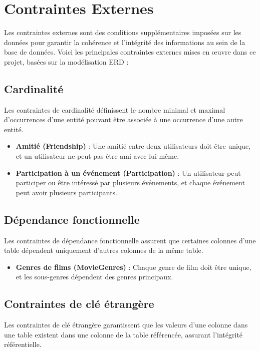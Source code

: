 \section{Contraintes Externes}

Les contraintes externes sont des conditions supplémentaires imposées sur les données pour garantir la cohérence et l'intégrité des informations au sein de la base de données. Voici les principales contraintes externes mises en œuvre dans ce projet, basées sur la modélisation ERD :

\subsection*{Cardinalité}

Les contraintes de cardinalité définissent le nombre minimal et maximal d'occurrences d'une entité pouvant être associée à une occurrence d'une autre entité.

\begin{itemize}
    \item \textbf{Amitié (Friendship)} : Une amitié entre deux utilisateurs doit être unique, et un utilisateur ne peut pas être ami avec lui-même.
    \item \textbf{Participation à un événement (Participation)} : Un utilisateur peut participer ou être intéressé par plusieurs événements, et chaque événement peut avoir plusieurs participants.
\end{itemize}

\subsection*{Dépendance fonctionnelle}

Les contraintes de dépendance fonctionnelle assurent que certaines colonnes d'une table dépendent uniquement d'autres colonnes de la même table.

\begin{itemize}
    \item \textbf{Genres de films (MovieGenres)} : Chaque genre de film doit être unique, et les sous-genres dépendent des genres principaux.
\end{itemize}

\subsection*{Contraintes de clé étrangère}

Les contraintes de clé étrangère garantissent que les valeurs d'une colonne dans une table existent dans une colonne de la table référencée, assurant l'intégrité référentielle.

